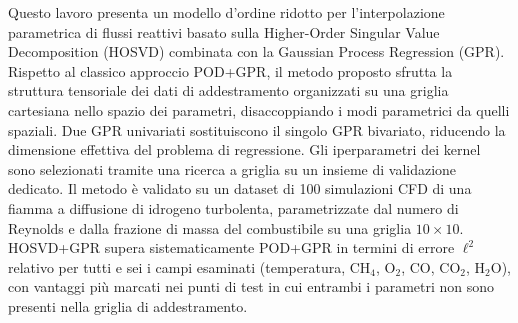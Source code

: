 Questo lavoro presenta un modello d'ordine ridotto per l'interpolazione parametrica di flussi reattivi basato sulla Higher-Order Singular Value Decomposition (HOSVD) combinata con la Gaussian Process Regression (GPR). Rispetto al classico approccio POD+GPR, il metodo proposto sfrutta la struttura tensoriale dei dati di addestramento organizzati su una griglia cartesiana nello spazio dei parametri, disaccoppiando i modi parametrici da quelli spaziali. Due GPR univariati sostituiscono il singolo GPR bivariato, riducendo la dimensione effettiva del problema di regressione. Gli iperparametri dei kernel sono selezionati tramite una ricerca a griglia su un insieme di validazione dedicato. Il metodo è validato su un dataset di 100 simulazioni CFD di una fiamma a diffusione di idrogeno turbolenta, parametrizzate dal numero di Reynolds e dalla frazione di massa del combustibile su una griglia $10\times10$. HOSVD+GPR supera sistematicamente POD+GPR in termini di errore $\ell^2$ relativo per tutti e sei i campi esaminati (temperatura, CH$_4$, O$_2$, CO, CO$_2$, H$_2$O), con vantaggi più marcati nei punti di test in cui entrambi i parametri non sono presenti nella griglia di addestramento.
